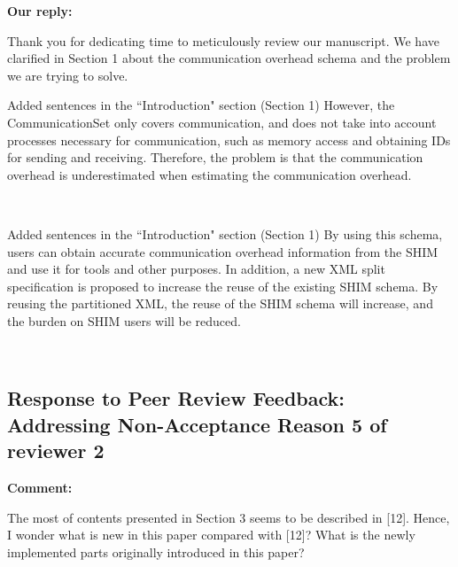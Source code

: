 \documentclass{article}
\begin{document}
\begin{flushleft}
  \textbf{Our reply:}
\end{flushleft}

\begin{adjustwidth}{1cm}{1cm}  %
    Thank you for dedicating time to meticulously review our manuscript. We have clarified in Section 1 about the communication overhead schema and the problem we are trying to solve.
\end{adjustwidth}
\bigskip
\begin{itembox}[|]{Added sentences in the ``Introduction" section (Section 1)}
    However, the CommunicationSet only covers communication, and does not take into account processes necessary for communication, such as memory access and obtaining IDs for sending and receiving.
    Therefore, the problem is that the communication overhead is underestimated when estimating the communication overhead.
\end{itembox}\\

\begin{itembox}[|]{Added sentences in the ``Introduction" section (Section 1)}
    By using this schema, users can obtain accurate communication overhead information from the SHIM and use it for tools and other purposes.
    In addition, a new XML split specification is proposed to increase the reuse of the existing SHIM schema. By reusing the partitioned XML, the reuse of the SHIM schema will increase, and the burden on SHIM users will be reduced.
\end{itembox}\\

\newpage
\subsection{Response to Peer Review Feedback: Addressing Non-Acceptance Reason 5 of reviewer 2}
\begin{flushleft}
  \textbf{Comment:}
\end{flushleft}
\begin{adjustwidth}{1cm}{1cm}  %
    The most of contents presented in Section 3 seems to be described in [12].  Hence, I wonder what is new in this paper compared with [12]?  What is the newly implemented parts originally introduced in this paper?  
\end{adjustwidth}
    
\end{document}
